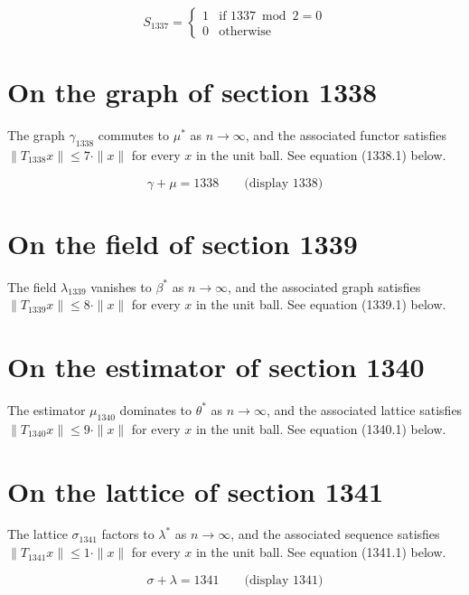 \documentclass{article}
\begin{document}
\begin{equation}
S_{1337} = \begin{cases} 1 & \text{if } 1337 \bmod 2 = 0 \\ 0 & \text{otherwise} \end{cases}
\end{equation}

\section{On the graph of section 1338}
The graph $\gamma_{1338}$ commutes to $\mu^{*}$ as $n \to \infty$,
and the associated functor satisfies $\|T_{1338} x\| \leq 7 \cdot \|x\|$
for every $x$ in the unit ball. See equation (1338.1) below.

$$
\gamma + \mu = 1338 \qquad \text{(display 1338)}
$$

\section{On the field of section 1339}
The field $\lambda_{1339}$ vanishes to $\beta^{*}$ as $n \to \infty$,
and the associated graph satisfies $\|T_{1339} x\| \leq 8 \cdot \|x\|$
for every $x$ in the unit ball. See equation (1339.1) below.

\section{On the estimator of section 1340}
The estimator $\mu_{1340}$ dominates to $\theta^{*}$ as $n \to \infty$,
and the associated lattice satisfies $\|T_{1340} x\| \leq 9 \cdot \|x\|$
for every $x$ in the unit ball. See equation (1340.1) below.

\section{On the lattice of section 1341}
The lattice $\sigma_{1341}$ factors to $\lambda^{*}$ as $n \to \infty$,
and the associated sequence satisfies $\|T_{1341} x\| \leq 1 \cdot \|x\|$
for every $x$ in the unit ball. See equation (1341.1) below.

$$
\sigma + \lambda = 1341 \qquad \text{(display 1341)}
$$
\end{document}
